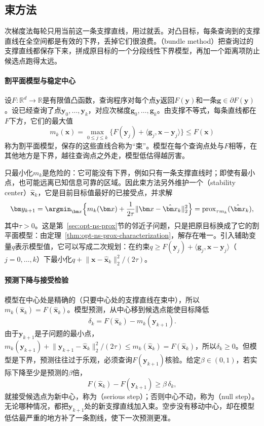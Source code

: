 \subsection{束方法}
\label{sec:opt-ns-bundle}

次梯度法每轮只用当前这一条支撑直线，用过就丢。对凸目标，每条查询到的支撑直线在全空间都是有效的下界，丢掉它们很浪费。（bundle method）把查询过的支撑直线都保存下来，拼成原目标的一个分段线性下界模型，再加一个距离项防止候选点跑得太远。

\paragraph{割平面模型与稳定中心}
设$F:\mathbb R^d\to\mathbb R$是有限值凸函数，查询程序对每个点$\bm y$返回$F(\bm y)$和一条$\bm g\in\partial F(\bm y)$。设已经查询了点$\bm y_0,\dots,\bm y_k$，对应次梯度$\bm g_0,\dots,\bm g_k$。由支撑不等式，每条直线都在$F$下方，它们的最大值
\[
 m_k(\bm x)=\max_{0\leq j\leq k}\bigl\{F(\bm y_j)+\langle\bm g_j,\bm x-\bm y_j\rangle\bigr\}\leq F(\bm x)
\]
称为割平面模型，保存的这些直线合称为“束”。模型在每个查询点处与$F$相等，在其他地方是下界，越往查询点之外走，模型低估得越厉害。

只最小化$m_k$是危险的：它可能没有下界，例如只有一条支撑直线时；即使有最小点，也可能远离已知信息可靠的区域。因此束方法另外维护一个（stability center）$\hat{\bm x}_k$，它是目前目标值最好的已接受点，并求解
\begin{equation}
 \bm y_{k+1}=\argmin_{\bm x}\Bigl\{m_k(\bm x)+\frac1{2\tau}\lVert\bm x-\hat{\bm x}_k\rVert_2^2\Bigr\}=\operatorname{prox}_{\tau m_k}(\hat{\bm x}_k),
 \label{eq:opt-ns-bundle-candidate}
\end{equation}
其中$\tau>0$。这是第~\ref{sec:opt-ns-prox}节的邻近子问题，只是把原目标换成了它的割平面模型：由定理~\ref{thm:opt-ns-prox-characterization}，解存在唯一。引入辅助变量$q$表示模型值，它可以写成二次规划：在约束$q\geq F(\bm y_j)+\langle\bm g_j,\bm x-\bm y_j\rangle$（$j=0,\dots,k$）下最小化$q+\lVert\bm x-\hat{\bm x}_k\rVert_2^2/(2\tau)$。

\paragraph{预测下降与接受检验}
模型在中心处是精确的（只要中心处的支撑直线在束中），所以$m_k(\hat{\bm x}_k)=F(\hat{\bm x}_k)$。模型预测，从中心移到候选点能使目标降低
\[
 \delta_k=F(\hat{\bm x}_k)-m_k(\bm y_{k+1}).
\]
由于$\bm y_{k+1}$是子问题的最小点，$m_k(\bm y_{k+1})+\lVert\bm y_{k+1}-\hat{\bm x}_k\rVert_2^2/(2\tau)\leq m_k(\hat{\bm x}_k)=F(\hat{\bm x}_k)$，所以$\delta_k\geq0$。但模型是下界，预测往往过于乐观，必须查询$F(\bm y_{k+1})$核验。给定$\beta\in(0,1)$，若实际下降至少是预测的$\beta$倍，
\[
 F(\hat{\bm x}_k)-F(\bm y_{k+1})\geq\beta\,\delta_k ,
\]
就接受候选点为新中心，称为（serious step）；否则中心不动，称为（null step）。无论哪种情况，都把$\bm y_{k+1}$处的新支撑直线加入束。空步没有移动中心，却在模型低估最严重的地方补了一条割线，使下一次预测更准。

